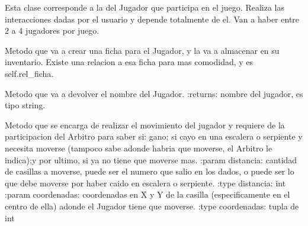 \documentclass[letterpaper,10pt,english]{sphinxmanual}
\begin{document}
\begin{fulllineitems}
\label{\detokenize{codigo:jugador.Jugador}}
Esta clase corresponde a la del Jugador que participa en el juego. Realiza las 
interacciones dadas por el usuario y depende totalmente de el. Van a haber entre 2 
a 4 jugadores por juego.

\begin{fulllineitems}
\label{\detokenize{codigo:jugador.Jugador.crear_ficha}}
Metodo que va a crear una ficha para el Jugador, y la va a almacenar en su 
inventario. Existe una relacion a esa ficha para mas comodidad, y es self.rel\_ficha.

\end{fulllineitems}


\begin{fulllineitems}
\label{\detokenize{codigo:jugador.Jugador.getNombre}}
Metodo que va a devolver el nombre del Jugador.
:returns: nombre del jugador, es tipo string.

\end{fulllineitems}


\begin{fulllineitems}
\label{\detokenize{codigo:jugador.Jugador.mover}}
Metodo que se encarga de realizar el movimiento del jugador y requiere de la participacion del
Arbitro para saber si: gano; si cayo en una escalera o serpiente y necesita moverse (tampoco sabe
adonde habria que moverse, el Arbitro le indica);y por ultimo, si ya no tiene que moverse mas.
:param distancia: cantidad de casillas a moverse, puede ser el numero que salio en los dados, o
puede ser lo que debe moverse por haber caido en escalera o serpiente.
:type distancia: int
:param coordenadas: coordenadas en X y Y de la casilla (especificamente en el centro de ella) adonde 
el Jugador tiene que moverse.
:type coordenadas: tupla de int


\end{fulllineitems}
\end{fulllineitems}
\end{document}
